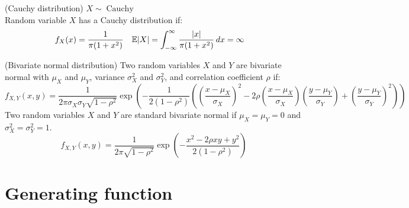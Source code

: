 \documentclass{huhtakm-template-book}
\newcommand{\expect}{\mathbb{E}}
\DeclareMathOperator{\Cauchy}{Cauchy}
\begin{document}
\begin{seg}(Cauchy distribution) $X\sim\Cauchy$\\
    Random variable $X$ has a Cauchy distribution if:
    \begin{align*}
        f_{X}(x)&=\frac{1}{\pi(1+x^{2})} & \expect|X|&=\intinfty\frac{|x|}{\pi(1+x^{2})}\,dx=\infty
    \end{align*}
\end{seg}
\begin{seg}(Bivariate normal distribution)
    Two random variables $X$ and $Y$ are bivariate normal with $\mu_{X}$ and $\mu_{Y}$, variance $\sigma_{X}^{2}$ and $\sigma_{Y}^{2}$, and correlation coefficient $\rho$ if:
    \begin{equation*}
    f_{X,Y}(x,y)=\frac{1}{2\pi\sigma_{X}\sigma_{Y}\sqrt{1-\rho^{2}}}\exp\left(-\frac{1}{2(1-\rho^{2})}\left(\left(\frac{x-\mu_{X}}{\sigma_{X}}\right)^{2}-2\rho\left(\frac{x-\mu_{X}}{\sigma_{X}}\right)\left(\frac{y-\mu_{Y}}{\sigma_{Y}}\right)+\left(\frac{y-\mu_{Y}}{\sigma_{Y}}\right)^{2}\right)\right)
    \end{equation*}
    Two random variables $X$ and $Y$ are standard bivariate normal if $\mu_{X}=\mu_{Y}=0$ and $\sigma_{X}^{2}=\sigma_{Y}^{2}=1$.
    \begin{equation*}
        f_{X,Y}(x,y)=\frac{1}{2\pi\sqrt{1-\rho^{2}}}\exp\left(-\frac{x^{2}-2\rho xy+y^{2}}{2(1-\rho^{2})}\right)
    \end{equation*}
\end{seg}

\chapter{Generating function}
\end{document}
